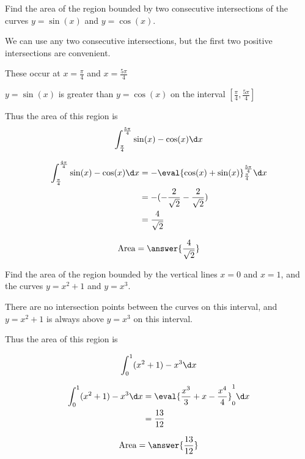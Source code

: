 \documentclass[handout]{ximera}
\begin{document}
\begin{exercise}
Find the area of the region bounded by two consecutive intersections of the curves $y=\sin(x)$ and $y = \cos(x)$.

\begin{hint}
  We can use any two consecutive intersections, but the first two positive intersections are convenient.

  These occur at $x = \frac{\pi}{4}$ and $x = \frac{5\pi}{4}$
\end{hint}

\begin{hint}
  $y = \sin(x)$ is greater than $y=\cos(x)$ on the interval $[\frac{\pi}{4},\frac{5\pi}{4}]$
\end{hint}

\begin{hint}
	Thus the area of this region is
	\[
	\int_{\frac{\pi}{4}}^{\frac{5\pi}{4}} \sin(x) - \cos(x) \d x
	\]
\end{hint}

\begin{hint}
  \begin{align*}
	  \int_{\frac{\pi}{4}}^{\frac{4\pi}{4}} \sin(x) - \cos(x) \d x &=  -\eval{\cos(x)+\sin(x)}_{\frac{\pi}{4}}^{\frac{5\pi}{4}}  \d x\\
		&=-(-\frac{2}{\sqrt{2}} - \frac{2}{\sqrt{2}})\\
		&= \frac{4}{\sqrt{2}}
	\end{align*}
\end{hint}

  \[
  \textrm{Area} = \answer{\frac{4}{\sqrt{2}}}
  \]

\end{exercise}

\begin{exercise}
Find the area of the region bounded by the vertical lines $x=0$ and $x=1$, and the curves $y = x^2+1$ and $y = x^3$.

\begin{hint}
	There are no intersection points between the curves on this interval, and $y = x^2+1$ is always above $y=x^3$ on this interval.
\end{hint}


\begin{hint}
	Thus the area of this region is

	\[
	\int_{0}^{1} (x^2+1)-x^3 \d x
	\]
\end{hint}

\begin{hint}
	\begin{align*}
		\int_{0}^{1} (x^2+1)-x^3 \d x &=  \eval{\frac{x^3}{3}+x-\frac{x^4}{4}}_0^1  \d x\\
		&= \frac{13}{12}
	\end{align*}
\end{hint}

	\[
		\textrm{Area} = \answer{\frac{13}{12}}
	\]

\end{exercise}
\end{document}
